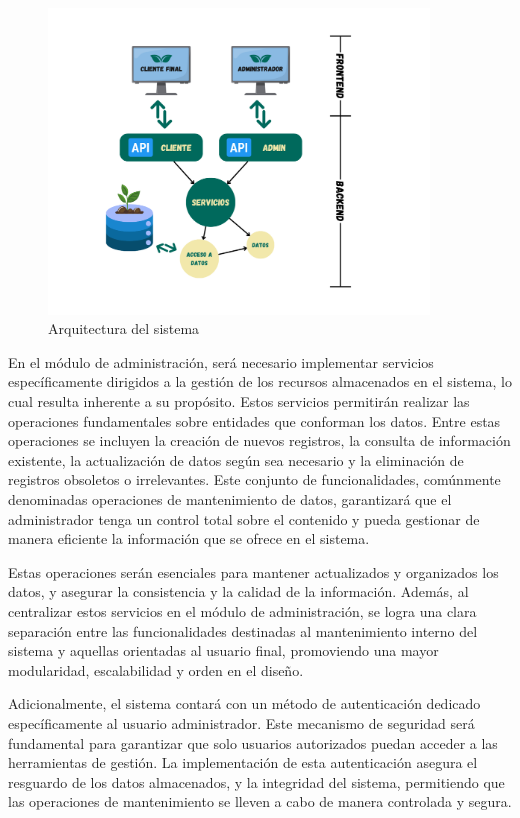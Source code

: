 \begin{figure}[ht!]
    \centering
    \includegraphics[width=0.9\textwidth]{Images/architecture.png}
    \caption{Arquitectura del sistema}
    \label{fig:architecture}
\end{figure}


En el módulo de administración, será necesario implementar servicios específicamente dirigidos a la gestión de 
los recursos almacenados en el sistema, lo cual resulta inherente a su propósito. Estos servicios permitirán 
realizar las operaciones fundamentales sobre entidades que conforman los datos. Entre estas operaciones se incluyen 
la creación de nuevos registros, la consulta de información existente, la actualización de datos 
según sea necesario y la eliminación de registros obsoletos o irrelevantes. Este conjunto de funcionalidades, 
comúnmente denominadas operaciones de mantenimiento de datos, garantizará que el administrador tenga un 
control total sobre el contenido y pueda gestionar de manera eficiente la información que se ofrece en el sistema.

Estas operaciones serán esenciales para mantener actualizados y organizados los datos, y asegurar la consistencia y 
la calidad de la información. Además, al centralizar estos servicios en el módulo de administración, se logra una 
clara separación entre las funcionalidades destinadas al mantenimiento interno del sistema y aquellas orientadas 
al usuario final, promoviendo una mayor modularidad, escalabilidad y orden en el diseño.

Adicionalmente, el sistema contará con un método de autenticación dedicado específicamente al usuario administrador. 
Este mecanismo de seguridad será fundamental para garantizar que solo usuarios autorizados puedan acceder a las herramientas 
de gestión. La implementación de esta autenticación asegura el resguardo de los datos almacenados, y la integridad 
del sistema, permitiendo que las operaciones de mantenimiento se lleven a cabo de manera controlada y segura.


